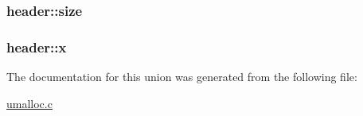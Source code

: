 \subsubsection[{\texorpdfstring{size}{size}}]{ header\+::size}\hypertarget{unionheader_a70db454b20b4a40995532b7ea029a527}{}\label{unionheader_a70db454b20b4a40995532b7ea029a527}
\subsubsection[{\texorpdfstring{x}{x}}]{ header\+::x}\hypertarget{unionheader_a2f321dbb657408f93d0c585f55951bdb}{}\label{unionheader_a2f321dbb657408f93d0c585f55951bdb}


The documentation for this union was generated from the following file\+:\begin{DoxyCompactItemize}
\item 
\hyperlink{umalloc_8c}{umalloc.\+c}\end{DoxyCompactItemize}

